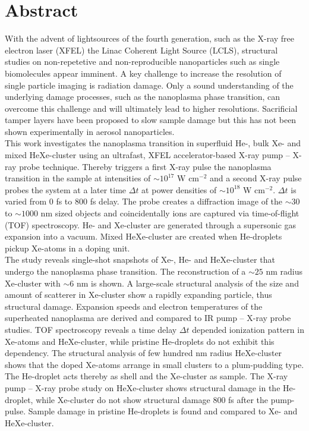 \section*{Abstract}\label{ch:abstract}
With the advent of lightsources of the fourth generation, such as the X-ray free electron laser (XFEL) the Linac Coherent Light Source (LCLS), structural studies on non-repetetive and non-reproducible nanoparticles such as single biomolecules appear imminent. A key challenge to increase the resolution of single particle imaging is radiation damage. Only a sound understanding of the underlying damage processes, such as the nanoplasma phase transition, can overcome this challenge and will ultimately lead to higher resolutions. Sacrificial tamper layers have been proposed to slow sample damage but this has not been shown experimentally in aerosol nanoparticles.\\[1\baselineskip]
This work investigates the nanoplasma transition in superfluid He-, bulk Xe- and mixed HeXe-cluster using an ultrafast, XFEL accelerator-based X-ray pump -- X-ray probe technique. Thereby triggers a first X-ray pulse the nanoplasma transition in the sample at intensities of $\sim 10^{17}$ W cm$^{-2}$ and a second X-ray pulse probes the system at a later time $\Delta t$ at power densities of $\sim 10^{18}$ W cm$^{-2}$. $\Delta t$ is varied from 0 fs to 800 fs delay. The probe creates a diffraction image of the $\sim 30$ to $\sim 1000$ nm sized objects and coincidentally ions are captured via time-of-flight (TOF) spectroscopy. He- and Xe-cluster are generated through a supersonic gas expansion into a vacuum. Mixed HeXe-cluster are created when He-droplets pickup Xe-atoms in a doping unit.\\[1\baselineskip]
The study reveals single-shot snapshots of Xe-, He- and HeXe-cluster that undergo the nanoplasma phase transition. The reconstruction of a $\sim 25$ nm radius Xe-cluster with $\sim 6$ nm is shown. A large-scale structural analysis of the size and amount of scatterer in Xe-cluster show a rapidly expanding particle, thus structural damage. Expansion speeds and electron temperatures of the superheated nanoplasma are derived and compared to IR pump -- X-ray probe studies. TOF spectroscopy reveals a time delay $\Delta t$ depended ionization pattern in Xe-atoms and HeXe-cluster, while pristine He-droplets do not exhibit this dependency. The structural analysis of few hundred nm radius HeXe-cluster shows that the doped Xe-atoms arrange in small clusters to a plum-pudding type. The He-droplet acts thereby as shell and the Xe-cluster as sample. The X-ray pump -- X-ray probe study on HeXe-cluster shows structural damage in the He-droplet, while Xe-cluster do not show structural damage 800 fs after the pump-pulse. Sample damage in pristine He-droplets is found and compared to Xe- and HeXe-cluster.
%
%
%
%